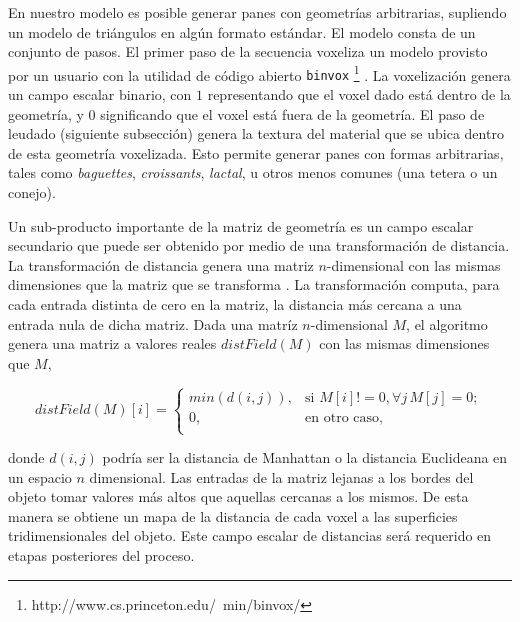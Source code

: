 \documentclass[spanish,a4paper,openright,11pt]{book}
\begin{document}
En nuestro modelo es posible generar panes con geometrías arbitrarias, supliendo un modelo de triángulos en algún formato estándar.
El modelo consta de un conjunto de pasos. El primer paso de la secuencia voxeliza un modelo provisto por un usuario con la utilidad de código abierto {\tt binvox} \footnote{http://www.cs.princeton.edu/~min/binvox/} \cite{Nooruddin2003}.
La voxelización genera un campo escalar binario, con $1$ representando que el voxel dado está dentro de la geometría, y $0$ significando que el voxel está fuera de la geometría.
El paso de leudado (siguiente subsección) genera la textura del material que se ubica dentro de esta geometría voxelizada.
Esto permite generar panes con formas arbitrarias, tales como {\em baguettes}, {\em croissants}, {\em lactal}, u otros menos comunes (una tetera o un conejo).

Un sub-producto importante de la matriz de geometría es un campo escalar secundario que puede ser obtenido por medio de una transformación de distancia.
La transformación de distancia genera una matriz $n$-dimensional con las mismas dimensiones que la matriz que se transforma \cite{osh03}.
La transformación computa, para cada entrada distinta de cero en la matriz, la distancia más cercana a una entrada nula de dicha matriz.
Dada una matríz $n$-dimensional $M$, el algoritmo genera una matriz a valores reales $distField(M)$ con las mismas dimensiones que $M$,

\[
distField(M)[i] =
\begin{cases}
min(d(i,j)), & \text{si } M[i] != 0, \forall j \, M[j] = 0;\\
0, & \text{en otro caso, }\\
\end{cases}
\]


\noindent
donde $d(i,j)$ podría ser la distancia de Manhattan o la distancia Euclideana en un espacio $n$ dimensional.
Las entradas de la matriz lejanas a los bordes del objeto tomar valores más altos que aquellas cercanas a los mismos.
De esta manera se obtiene un mapa de la distancia de cada voxel a las superficies tridimensionales del objeto.
Este campo escalar de distancias será requerido en etapas posteriores del proceso.
\end{document}
